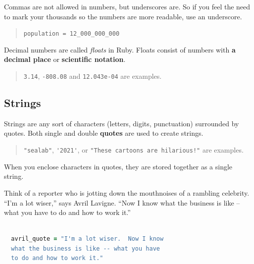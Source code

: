 \documentclass[10pt,twoside]{report}
\begin{document}
Commas are not allowed in numbers, but underscores are.  So if you
feel the need to mark your thousands so the numbers are more readable,
use an underscore.

\begin{quote}
\lstinline[breaklines=true]|population = 12_000_000_000|\end{quote}


Decimal numbers are called {\em floats} in Ruby.  Floats consist of
numbers with {\bf a decimal place} or {\bf scientific notation}.

\begin{quote}
\lstinline[breaklines=true]|3.14|,
\lstinline[breaklines=true]|-808.08| and
\lstinline[breaklines=true]|12.043e-04| are examples.\end{quote}





\subsection{Strings}



Strings are any sort of characters (letters, digits, punctuation)
surrounded by quotes.  Both single and double {\bf quotes} are used to
create strings.

\begin{quote}
\lstinline[breaklines=true]|"sealab"|,
\lstinline[breaklines=true]|'2021'|, or
\lstinline[breaklines=true]|"These cartoons are hilarious!"| are
examples.\end{quote}


When you enclose characters in quotes, they are stored together as a
single string.

Think of a reporter who is jotting down the mouthnoises of a rambling
celebrity.  ``I'm a lot wiser,'' says Avril Lavigne.  ``Now I know
what the business is like -- what you have to do and how to work it.''


\begin{lstlisting}[basicstyle=\ttfamily\color{basiccolor},
    commentstyle = \ttfamily\color{commentcolor},
    keywordstyle=\ttfamily\color{keywordscolor},
    stringstyle=\color{stringcolor},
    language=Ruby,
    basicstyle=\small\ttfamily,
    showstringspaces=false,
  ]

  avril_quote = "I'm a lot wiser.  Now I know
  what the business is like -- what you have
  to do and how to work it."

\end{lstlisting}
\end{document}
